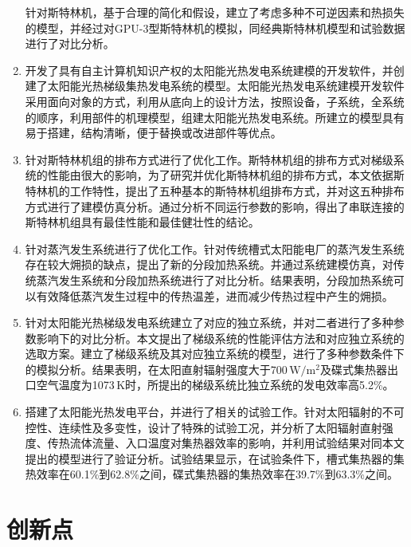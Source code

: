\begin{enumerate}[label=(\arabic*)]
  针对斯特林机，基于合理的简化和假设，建立了考虑多种不可逆因素和热损失的模型，并经过对GPU-3型斯特林机的模拟，同经典斯特林机模型和试验数据进行了对比分析。
  \item 开发了具有自主计算机知识产权的太阳能光热发电系统建模的开发软件，并创建了太阳能光热梯级集热发电系统的模型。太阳能光热发电系统建模开发软件采用面向对象的方式，利用从底向上的设计方法，按照设备，子系统，全系统的顺序，利用部件的机理模型，组建太阳能光热发电系统。所建立的模型具有易于搭建，结构清晰，便于替换或改进部件等优点。
  \item 针对斯特林机组的排布方式进行了优化工作。斯特林机组的排布方式对梯级系统的性能由很大的影响，为了研究并优化斯特林机组的排布方式，本文依据斯特林机的工作特性，提出了五种基本的斯特林机组排布方式，并对这五种排布方式进行了建模仿真分析。通过分析不同运行参数的影响，得出了串联连接的斯特林机组具有最佳性能和最佳健壮性的结论。
  \item 针对蒸汽发生系统进行了优化工作。针对传统槽式太阳能电厂的蒸汽发生系统存在较大㶲损的缺点，提出了新的分段加热系统。并通过系统建模仿真，对传统蒸汽发生系统和分段加热系统进行了对比分析。结果表明，分段加热系统可以有效降低蒸汽发生过程中的传热温差，进而减少传热过程中产生的㶲损。
  \item 针对太阳能光热梯级发电系统建立了对应的独立系统，并对二者进行了多种参数影响下的对比分析。本文提出了梯级系统的性能评估方法和对应独立系统的选取方案。建立了梯级系统及其对应独立系统的模型，进行了多种参数条件下的模拟分析。结果表明，在太阳直射辐射强度大于700\,$\mathrm{W/m^2}$及碟式集热器出口空气温度为1073$\,\mathrm{K}$时，所提出的梯级系统比独立系统的发电效率高5.2\%。
	\item 搭建了太阳能光热发电平台，并进行了相关的试验工作。针对太阳辐射的不可控性、连续性及多变性，设计了特殊的试验工况，并分析了太阳辐射直射强度、传热流体流量、入口温度对集热器效率的影响，并利用试验结果对同本文提出的模型进行了验证分析。试验结果显示，在试验条件下，槽式集热器的集热效率在60.1\%到62.8\%之间，碟式集热器的集热效率在39.7\%到63.3\%之间。
\end{enumerate}

\section{创新点}

